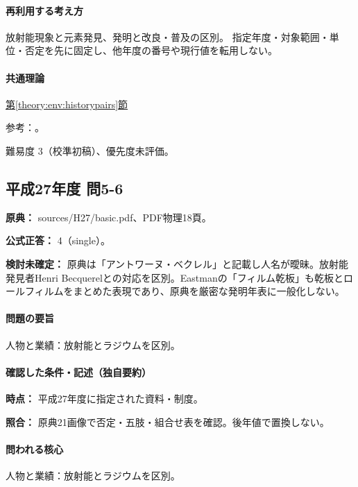\paragraph{再利用する考え方} 放射能現象と元素発見、発明と改良・普及の区別。 指定年度・対象範囲・単位・否定を先に固定し、他年度の番号や現行値を転用しない。

\paragraph{共通理論} \hyperref[theory:env:historypairs]{第\ref*{theory:env:historypairs}節}

\par 参考：\cite{env58_curie}。

\par 難易度 3（校準初稿）、優先度未評価。

\subsection{平成27年度 問5-6}
\label{q:h27-reg-basic-5-6}

\noindent\textbf{原典：} sources/H27/basic.pdf、PDF物理18頁。

\textbf{公式正答：} 4（single）。

\par\textbf{検討未確定：} 原典は「アントワーヌ・ベクレル」と記載し人名が曖昧。放射能発見者Henri Becquerelとの対応を区別。Eastmanの「フィルム乾板」も乾板とロールフィルムをまとめた表現であり、原典を厳密な発明年表に一般化しない。

\paragraph{問題の要旨} 人物と業績：放射能とラジウムを区別。

\paragraph{確認した条件・記述（独自要約）}\mbox{}\par

\noindent\textbf{時点：} 平成27年度に指定された資料・制度。\par

\noindent\textbf{照合：} 原典21画像で否定・五肢・組合せ表を確認。後年値で置換しない。\par

\paragraph{問われる核心} 人物と業績：放射能とラジウムを区別。

